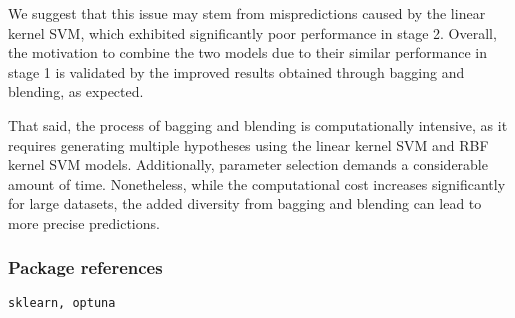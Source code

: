 We suggest that this issue may stem from mispredictions caused by the linear kernel SVM,
 which exhibited significantly poor performance in stage 2. 
 Overall, the motivation to combine the two models due to their similar performance in stage 1 is 
 validated by the improved results obtained through bagging and blending, as expected.

That said, the process of bagging and blending is computationally intensive, 
as it requires generating multiple hypotheses using the linear kernel SVM and RBF kernel SVM models. 
Additionally, parameter selection demands a considerable amount of time. Nonetheless, 
while the computational cost increases significantly for large datasets, 
the added diversity from bagging and blending can lead to more precise predictions.

\subsubsection*{Package references}
\begin{lstlisting}[language=Python]
sklearn, optuna
\end{lstlisting}